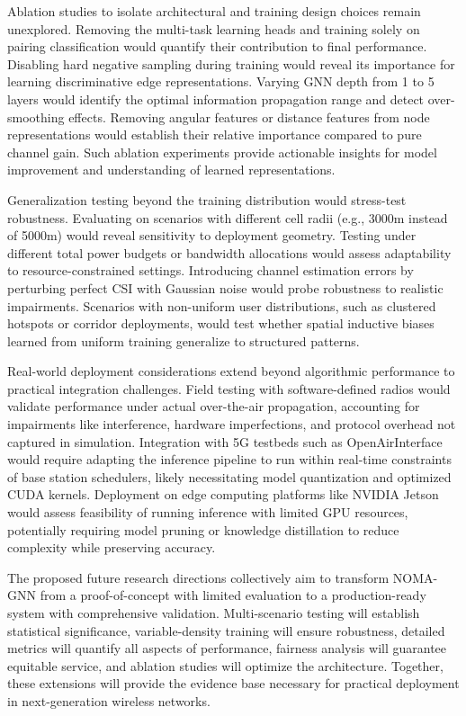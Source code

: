 Ablation studies to isolate architectural and training design choices remain unexplored. Removing the multi-task learning heads and training solely on pairing classification would quantify their contribution to final performance. Disabling hard negative sampling during training would reveal its importance for learning discriminative edge representations. Varying GNN depth from 1 to 5 layers would identify the optimal information propagation range and detect over-smoothing effects. Removing angular features or distance features from node representations would establish their relative importance compared to pure channel gain. Such ablation experiments provide actionable insights for model improvement and understanding of learned representations.

Generalization testing beyond the training distribution would stress-test robustness. Evaluating on scenarios with different cell radii (e.g., 3000m instead of 5000m) would reveal sensitivity to deployment geometry. Testing under different total power budgets or bandwidth allocations would assess adaptability to resource-constrained settings. Introducing channel estimation errors by perturbing perfect CSI with Gaussian noise would probe robustness to realistic impairments. Scenarios with non-uniform user distributions, such as clustered hotspots or corridor deployments, would test whether spatial inductive biases learned from uniform training generalize to structured patterns.

Real-world deployment considerations extend beyond algorithmic performance to practical integration challenges. Field testing with software-defined radios would validate performance under actual over-the-air propagation, accounting for impairments like interference, hardware imperfections, and protocol overhead not captured in simulation. Integration with 5G testbeds such as OpenAirInterface would require adapting the inference pipeline to run within real-time constraints of base station schedulers, likely necessitating model quantization and optimized CUDA kernels. Deployment on edge computing platforms like NVIDIA Jetson would assess feasibility of running inference with limited GPU resources, potentially requiring model pruning or knowledge distillation to reduce complexity while preserving accuracy.

The proposed future research directions collectively aim to transform NOMA-GNN from a proof-of-concept with limited evaluation to a production-ready system with comprehensive validation. Multi-scenario testing will establish statistical significance, variable-density training will ensure robustness, detailed metrics will quantify all aspects of performance, fairness analysis will guarantee equitable service, and ablation studies will optimize the architecture. Together, these extensions will provide the evidence base necessary for practical deployment in next-generation wireless networks.

